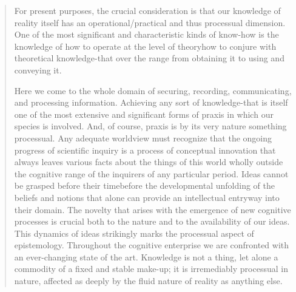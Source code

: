 \documentclass[a4paper]{Thesis}
\begin{document}
\begin{quotation}
		For present purposes, the crucial consideration is that our knowledge of reality itself has
		an operational/practical and thus processual dimension. One of the most significant and
		characteristic kinds of know-how is the knowledge of how to operate at the level of theoryhow to conjure with theoretical knowledge-that over the
		range from obtaining it to using and conveying it.
		
		Here we come to the whole domain of
		securing, recording, communicating, and processing information. Achieving any sort of
		knowledge-that is itself one of the most extensive and significant forms of praxis in which
		our species is involved. And, of course, praxis is by its very nature something processual.
		Any adequate worldview must recognize that the ongoing progress of scientific inquiry is
		a process of conceptual innovation that always leaves various facts about the things of
		this world wholly outside the cognitive range of the inquirers of any particular period.
		Ideas cannot be grasped before their timebefore the developmental unfolding of the
		beliefs and notions that alone can provide an intellectual entryway into their domain. The
		novelty that arises with the emergence of new cognitive processes is crucial both to the
		nature and to the availability of our ideas. This dynamics of ideas strikingly marks the
		processual aspect of epistemology. Throughout the cognitive enterprise we are
		confronted with an ever-changing state of the art. Knowledge is not a thing, let alone a
		commodity of a fixed and stable make-up; it is irremediably processual in nature, affected
		as deeply by the fluid nature of reality as anything else.
	\end{quotation}
	
\end{document}
